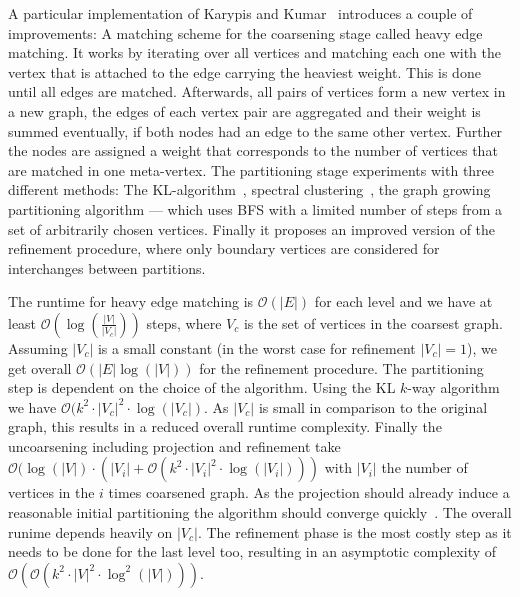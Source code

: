                 A particular implementation of Karypis and Kumar~\autocite{karypis} introduces a couple of improvements:
                A matching scheme for the coarsening stage called heavy edge matching.
                It works by iterating over all vertices and matching each one with the vertex that is attached to the edge carrying the heaviest weight.
                This is done until all edges are matched.
                Afterwards, all pairs of vertices form a new vertex in a new graph, the edges of each vertex pair are aggregated and their weight is summed eventually, if both nodes had an edge to the same other vertex. 
                Further the nodes are assigned a weight that corresponds to the number of vertices that are matched in one meta-vertex.
                The partitioning stage experiments with three different methods: The KL-algorithm~\autocite{kl}, spectral clustering~\autocite{spectral}, the graph growing partitioning algorithm --- which uses BFS with a limited number of steps from a set of arbitrarily chosen vertices.
                Finally it proposes an improved version of the refinement procedure, where only boundary vertices are considered for interchanges between partitions.
                
                The runtime for heavy edge matching is $\mathcal{O}(|E|)$ for each level and we have at least $\mathcal{O}(\log(\frac{|V|}{|V_c|}))$ steps, where $V_c$ is the set of vertices in the coarsest graph. 
                Assuming $|V_c|$ is a small constant (in the worst case for refinement $|V_c| = 1$), we get overall $\mathcal{O}(|E| \log(|V|))$ for the refinement procedure.
                The partitioning step is dependent on the choice of the algorithm.
                Using the KL $k$-way algorithm we have  $\mathcal{O}(k^2 \cdot |V_c|^2 \cdot \log(|V_c|)$. As $|V_c|$ is small in comparison to the original graph, this results in a reduced overall runtime complexity.
                Finally the uncoarsening including projection and refinement take $\mathcal{O}(\log(|V|) \cdot (|V_i| + \mathcal{O}(k^2 \cdot |V_i|^2 \cdot \log(|V_i|)))$ with $|V_i|$ the number of vertices in the $i$ times coarsened graph.  
                As the projection should already induce a reasonable initial partitioning the algorithm should converge quickly~\autocite{hendrickson1995multi}.
                The overall runime depends heavily on $|V_c|$. 
                The refinement phase is the most costly step as it needs to be done for the last level too, resulting in an asymptotic complexity of $\mathcal{O}(\mathcal{O}(k^2 \cdot |V|^2 \cdot \log^2(|V|)))$.
                
